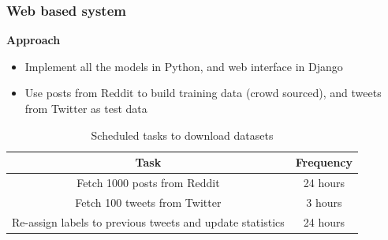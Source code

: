 \documentclass{beamer}
\begin{document}
    \begin{frame}
        \frametitle{Web based system}
        \begin{center}
            \textbf{Approach}
        \end{center}
        \begin{itemize}
            \item{Implement all the models in Python, and web interface in Django}
            \item{Use posts from Reddit to build training data (crowd sourced), and tweets from Twitter as test data}
        \end{itemize}
        \begin{table}
            \begin{center}
                \begin{tabular}{ | c | c | }
                    \hline
                    \textbf{Task} & \textbf{Frequency} \\
                    \hline
                    Fetch 1000 posts from Reddit & 24 hours \\
                    \hline
                    Fetch 100 tweets from Twitter & 3 hours \\
                    \hline
                    Re-assign labels to previous tweets and update statistics & 24 hours \\
                    \hline
                \end{tabular}
            \end{center}
            \caption{Scheduled tasks to download datasets}
        \end{table}
    \end{frame}
\end{document}
